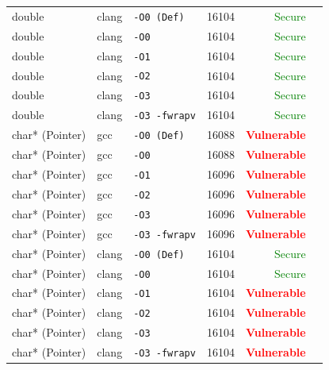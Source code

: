 \begin{table}[htbp]
\begin{tabular}{@{}lllcrl@{}}
double & clang & \texttt{-O0 (Def)} & 16104 & \textcolor{green}{Secure}} \\
double & clang & \texttt{-O0} & 16104 & \textcolor{green}{Secure}} \\
double & clang & \texttt{-O1} & 16104 & \textcolor{green}{Secure}} \\
double & clang & \texttt{-O2} & 16104 & \textcolor{green}{Secure}} \\
double & clang & \texttt{-O3} & 16104 & \textcolor{green}{Secure}} \\
double & clang & \texttt{-O3 -fwrapv} & 16104 & \textcolor{green}{Secure}} \\
\midrule
char* (Pointer) & gcc & \texttt{-O0 (Def)} & 16088 & \textbf{\textcolor{red}{Vulnerable}} \\
char* (Pointer) & gcc & \texttt{-O0} & 16088 & \textbf{\textcolor{red}{Vulnerable}} \\
char* (Pointer) & gcc & \texttt{-O1} & 16096 & \textbf{\textcolor{red}{Vulnerable}} \\
char* (Pointer) & gcc & \texttt{-O2} & 16096 & \textbf{\textcolor{red}{Vulnerable}} \\
char* (Pointer) & gcc & \texttt{-O3} & 16096 & \textbf{\textcolor{red}{Vulnerable}} \\
char* (Pointer) & gcc & \texttt{-O3 -fwrapv} & 16096 & \textbf{\textcolor{red}{Vulnerable}} \\
char* (Pointer) & clang & \texttt{-O0 (Def)} & 16104 & \textcolor{green}{Secure}} \\
char* (Pointer) & clang & \texttt{-O0} & 16104 & \textcolor{green}{Secure}} \\
char* (Pointer) & clang & \texttt{-O1} & 16104 & \textbf{\textcolor{red}{Vulnerable}} \\
char* (Pointer) & clang & \texttt{-O2} & 16104 & \textbf{\textcolor{red}{Vulnerable}} \\
char* (Pointer) & clang & \texttt{-O3} & 16104 & \textbf{\textcolor{red}{Vulnerable}} \\
char* (Pointer) & clang & \texttt{-O3 -fwrapv} & 16104 & \textbf{\textcolor{red}{Vulnerable}} \\
\midrule
\bottomrule \end{tabular} \end{table}
